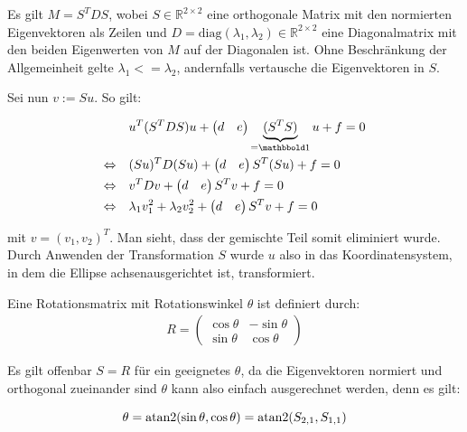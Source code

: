 Es gilt $M = S^TDS$, wobei $S\in\mathbb{R}^{2\times2}$ eine orthogonale Matrix mit den normierten Eigenvektoren als Zeilen und $D = \text{diag}(\lambda_1, \lambda_2)\in\mathbb{R}^{2\times2}$ eine Diagonalmatrix mit den beiden Eigenwerten von $M$ auf der Diagonalen ist. Ohne Beschränkung der Allgemeinheit gelte $\lambda_1 <= \lambda_2$, andernfalls vertausche die Eigenvektoren in $S$. 

Sei nun $v := Su$.
So gilt:

\begin{equation} \label{eq:PCARot}
\begin{aligned}
&u^T(S^TDS)u +\begin{pmatrix}d & e\end{pmatrix}\underbrace{(S^TS)}_{=\ind}u + f = 0 \\
\Leftrightarrow\quad &(Su)^TD(Su) +\begin{pmatrix}d & e\end{pmatrix}S^T(Su) + f = 0 \\
\Leftrightarrow\quad &v^{T}Dv +\begin{pmatrix}d & e\end{pmatrix}S^Tv + f = 0 \\
\Leftrightarrow\quad &\lambda_1v_1^2 + \lambda_2v_2^2 +\begin{pmatrix}d & e\end{pmatrix}S^Tv + f = 0 
\end{aligned}
\end{equation}

mit $v = (v_1,v_2)^T$. Man sieht, dass der gemischte Teil somit eliminiert wurde. Durch Anwenden der Transformation $S$ wurde $u$ also in das Koordinatensystem, in dem die Ellipse achsenausgerichtet ist,  transformiert.

Eine Rotationsmatrix mit Rotationswinkel $\theta$ ist definiert durch: 
\begin{equation}
\begin{aligned}
R = \begin{pmatrix}\cos\theta & -\sin\theta \\ \sin\theta & \cos\theta\end{pmatrix}
\end{aligned}
\end{equation}

Es gilt offenbar $S = R$ für ein geeignetes $\theta$, da die Eigenvektoren normiert und orthogonal zueinander sind $\theta$ kann also einfach ausgerechnet werden, denn es gilt:

\begin{equation*}
\theta = \text{atan2}(\sin\theta, \cos\theta) = \text{atan2}(S_{2,1}, S_{1,1})
\end{equation*}

